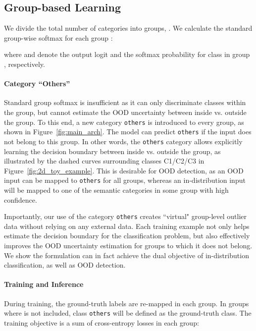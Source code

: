 \documentclass[final]{cvpr}
\begin{document}
\subsection{Group-based Learning}
\label{sec:group-softmax}
We divide the total number of  categories into  groups, . We calculate the standard group-wise softmax for each group :
\vspace{-0.2cm}

where  and  denote the output logit and the softmax probability for class  in group , respectively.

\vspace{-0.2cm}
\paragraph{Category ``Others''} Standard group softmax is insufficient as it can only discriminate classes within the group, but cannot estimate the OOD uncertainty between inside vs. outside the group. To this end, a new category \texttt{others} is introduced to every group, as shown in Figure~\ref{fig:main_arch}. The model can predict \texttt{others} if the input  does not belong to this group. In other words, the \texttt{others} category allows explicitly learning the decision boundary between inside vs. outside the group, as illustrated by the dashed curves surrounding classes C1/C2/C3 in Figure~\ref{fig:2d_toy_example}. This is desirable for OOD detection, as an OOD input can be mapped to \texttt{others} for all groups, whereas an in-distribution input will be mapped to one of the semantic categories in some group with high confidence.


Importantly, our use of the category \texttt{others}  creates ``virtual" group-level outlier data without relying on any external data. Each training example  not only helps estimate the decision boundary for the classification problem, but also effectively improves the OOD uncertainty estimation for groups to which it does not belong. We show the formulation can in fact achieve the dual objective of in-distribution classification, as well as OOD detection. 



\vspace{-0.3cm}
\paragraph{Training and Inference} During training, the ground-truth labels are re-mapped in each group. In groups where  is not included, class \texttt{others} will be defined as the ground-truth class. 
The training objective is a sum of cross-entropy losses in each group:
\vspace{-0.2cm}
\end{document}

